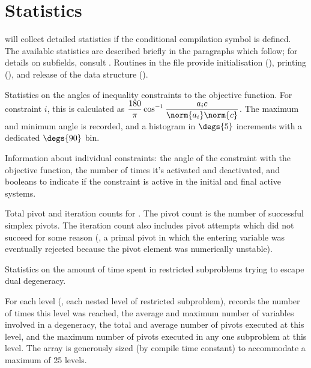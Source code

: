 
\section{\dylp Statistics}
\label{DylpStatistics}

\dylp will collect detailed statistics if the conditional compilation
symbol  is defined.
The available statistics are described briefly in the paragraphs which
follow; for details on subfields, consult .
Routines in the file  provide initialisation
(), printing (), and release of the
data structure ().

\begin{codedoc}
  \item
  Statistics on the angles of inequality constraints to the objective function.
  For constraint $i$, this is calculated as
  $\displaystyle \frac{180}{\pi} \cos^{-1} \frac{a_i c}{\norm{a_i}\norm{c}}$.
  The maximum and minimum angle is recorded, and a histogram in
  $\degs{5}$ increments with a dedicated $\degs{90}$ bin.

  \item
  Information about individual constraints: the angle of the constraint with
  the objective function, the number of times it's activated and deactivated,
  and booleans to indicate if the constraint is active in the initial and final
  active systems.

  \item{}
  Total pivot and iteration counts for \dylp.
  The pivot count is the number of successful simplex pivots.
  The iteration count also includes pivot attempts which did not succeed
  for some reason
  (\eg, a primal pivot in which the entering variable was eventually rejected
  because the pivot element was numerically unstable).

  \item{}
  Statistics on the amount of time spent in restricted subproblems trying to
  escape dual degeneracy.

  For each level (\ie, each nested level of restricted subproblem), \dylp
  records the number of times this level was reached, the average and maximum
  number of variables involved in a degeneracy, the total and average
  number of pivots executed at this level, and the maximum number of pivots
  executed in any one subproblem at this level.
  The array is generously sized (by compile time constant) to accommodate
  a maximum of 25 levels.


\end{codedoc}
